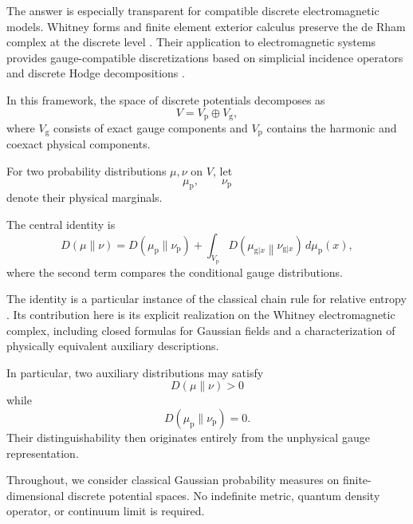 \documentclass[11pt]{article}
\theoremstyle{remark}
\begin{document}
The answer is especially transparent for compatible discrete
electromagnetic models. Whitney forms and finite element exterior
calculus preserve the de Rham complex at the discrete level
\cite{ArnoldFalkWinther2006,ArnoldFalkWinther2010}. Their
application to electromagnetic systems provides gauge-compatible
discretizations based on simplicial incidence operators and
discrete Hodge decompositions
\cite{Bossavit1998,Stern2015,Desbrun2005}.

In this framework, the space of discrete potentials decomposes as
\begin{equation}
V
=
V_{\mathrm p}\oplus V_{\mathrm g},
\label{eq:intro-splitting}
\end{equation}
where \(V_{\mathrm g}\) consists of exact gauge components and
\(V_{\mathrm p}\) contains the harmonic and coexact physical
components.

For two probability distributions \(\mu,\nu\) on \(V\), let
\begin{equation}
\mu_{\mathrm p},
\qquad
\nu_{\mathrm p}
\end{equation}
denote their physical marginals.

The central identity is
\begin{equation}
D(\mu\|\nu)
=
D(\mu_{\mathrm p}\|\nu_{\mathrm p})
+
\int_{V_{\mathrm p}}
D\left(
\mu_{\mathrm g|x}
\middle\|
\nu_{\mathrm g|x}
\right)
\,d\mu_{\mathrm p}(x),
\label{eq:intro-chain-rule}
\end{equation}
where the second term compares the conditional gauge
distributions.

The identity is a particular instance of the classical chain rule
for relative entropy \cite{CoverThomas2006,Kullback1951}. Its
contribution here is its explicit realization on the Whitney
electromagnetic complex, including closed formulas for Gaussian
fields and a characterization of physically equivalent auxiliary
descriptions.

In particular, two auxiliary distributions may satisfy
\begin{equation}
D(\mu\|\nu)>0
\end{equation}
while
\begin{equation}
D(\mu_{\mathrm p}\|\nu_{\mathrm p})=0.
\end{equation}
Their distinguishability then originates entirely from the
unphysical gauge representation.

Throughout, we consider classical Gaussian probability measures on
finite-dimensional discrete potential spaces. No indefinite metric,
quantum density operator, or continuum limit is required.
\end{document}
